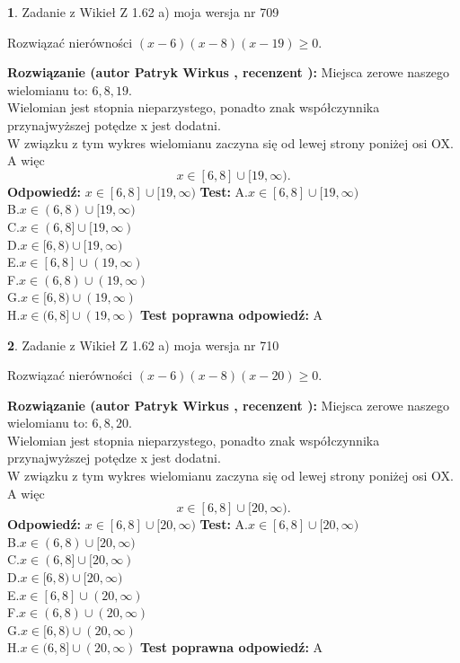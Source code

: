 \documentclass[12pt, a4paper]{article}
\theoremstyle{definition} %
\newtheorem{zad}{}
\newcommand{\zadStart}[1]{\begin{zad}#1\newline}
\newcommand{\zadStop}{\end{zad}}
\newcommand{\rozwStart}[2]{\noindent \textbf{Rozwiązanie (autor #1 , recenzent #2): }\newline}
\newcommand{\rozwStop}{\newline}
\newcommand{\odpStart}{\noindent \textbf{Odpowiedź:}\newline}
\newcommand{\odpStop}{\newline}
\newcommand{\testStart}{\noindent \textbf{Test:}\newline}
\newcommand{\testStop}{\newline}
\newcommand{\kluczStart}{\noindent \textbf{Test poprawna odpowiedź:}\newline}
\newcommand{\kluczStop}{\newline}
\begin{document}
\zadStart{Zadanie z Wikieł Z 1.62 a) moja wersja nr 709}

Rozwiązać nierówności $(x-6)(x-8)(x-19)\ge0$.
\zadStop
\rozwStart{Patryk Wirkus}{}
Miejsca zerowe naszego wielomianu to: $6, 8, 19$.\\
Wielomian jest stopnia nieparzystego, ponadto znak współczynnika przy\linebreak najwyższej potędze x jest dodatni.\\ W związku z tym wykres wielomianu zaczyna się od lewej strony poniżej osi OX. A więc $$x \in [6,8] \cup [19,\infty).$$
\rozwStop
\odpStart
$x \in [6,8] \cup [19,\infty)$
\odpStop
\testStart
A.$x \in [6,8] \cup [19,\infty)$\\
B.$x \in (6,8) \cup [19,\infty)$\\
C.$x \in (6,8] \cup [19,\infty)$\\
D.$x \in [6,8) \cup [19,\infty)$\\
E.$x \in [6,8] \cup (19,\infty)$\\
F.$x \in (6,8) \cup (19,\infty)$\\
G.$x \in [6,8) \cup (19,\infty)$\\
H.$x \in (6,8] \cup (19,\infty)$
\testStop
\kluczStart
A
\kluczStop



\zadStart{Zadanie z Wikieł Z 1.62 a) moja wersja nr 710}

Rozwiązać nierówności $(x-6)(x-8)(x-20)\ge0$.
\zadStop
\rozwStart{Patryk Wirkus}{}
Miejsca zerowe naszego wielomianu to: $6, 8, 20$.\\
Wielomian jest stopnia nieparzystego, ponadto znak współczynnika przy\linebreak najwyższej potędze x jest dodatni.\\ W związku z tym wykres wielomianu zaczyna się od lewej strony poniżej osi OX. A więc $$x \in [6,8] \cup [20,\infty).$$
\rozwStop
\odpStart
$x \in [6,8] \cup [20,\infty)$
\odpStop
\testStart
A.$x \in [6,8] \cup [20,\infty)$\\
B.$x \in (6,8) \cup [20,\infty)$\\
C.$x \in (6,8] \cup [20,\infty)$\\
D.$x \in [6,8) \cup [20,\infty)$\\
E.$x \in [6,8] \cup (20,\infty)$\\
F.$x \in (6,8) \cup (20,\infty)$\\
G.$x \in [6,8) \cup (20,\infty)$\\
H.$x \in (6,8] \cup (20,\infty)$
\testStop
\kluczStart
A
\kluczStop
\end{document}
